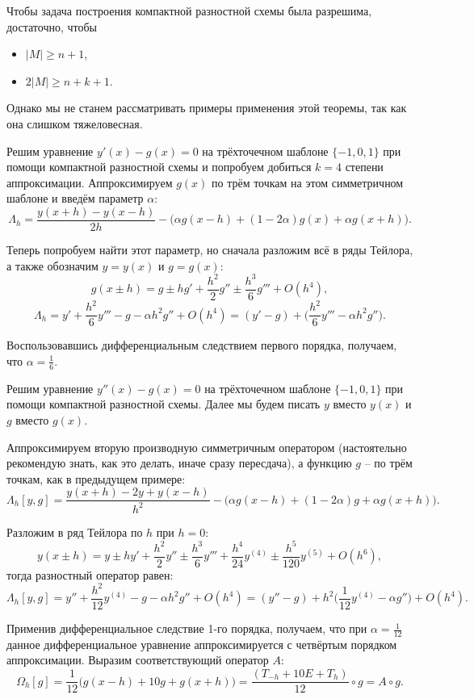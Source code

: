 \documentclass[../main.tex]{subfile}
\begin{document}
\begin{remark}
	Чтобы задача построения компактной разностной схемы была разрешима,
	достаточно, чтобы
	\begin{itemize}[nosep]
		\item $|M|\ge n+1$,
		\item $2|M|\ge n+k+1$.
	\end{itemize}
\end{remark}

Однако мы не станем рассматривать примеры применения этой теоремы, так как она
слишком тяжеловесная.

\begin{example}
	Решим уравнение $y'(x)-g(x)=0$ на трёхточечном шаблоне $\{-1,0,1\}$ при
	помощи компактной разностной схемы и попробуем добиться $k=4$ степени
	аппроксимации. Аппроксимируем $g(x)$ по трём точкам на этом симметричном
	шаблоне и введём параметр $\alpha$:
	\[\Lambda_h=\frac{y(x+h)-y(x-h)}{2h}-\big(\alpha g(x-h)+(1-2\alpha)g(x)+
	\alpha g(x+h)\big).\]

	Теперь попробуем найти этот параметр, но сначала разложим всё в ряды
	Тейлора, а также обозначим $y=y(x)$ и $g=g(x)$:
	\[g(x\pm h)=g\pm hg'+\frac{h^2}{2}g''\pm\frac{h^3}{6}g'''+O(h^4),\]
	\[\Lambda_h=y'+\frac{h^2}{6}y'''-g-\alpha h^2g''+O(h^4)=
	(y'-g)+\Big(\frac{h^2}{6}y'''-\alpha h^2g''\Big).\]

	Воспользовавшись дифференциальным следствием первого порядка, получаем,
	что $\alpha=\frac{1}{6}$.
\end{example}
\newpage

\begin{example}\label{eq:compact_ds_example}
	Решим уравнение $y''(x)-g(x)=0$ на трёхточечном шаблоне $\{-1,0,1\}$
	при помощи компактной разностной схемы. Далее мы будем писать $y$ вместо
	$y(x)$ и $g$ вместо $g(x)$.

	Аппроксимируем вторую производную симметричным оператором (настоятельно
	рекомендую знать, как это делать, иначе сразу пересдача), а функцию
	$g$ -- по трём точкам, как в предыдущем примере:
	\[\Lambda_h[y,g]=\frac{y(x+h)-2y+y(x-h)}{h^2}-\big(\alpha g(x-h)+
	(1-2\alpha)g+\alpha g(x+h)\big).\]

	Разложим в ряд Тейлора по $h$ при $h=0$:
	\[y(x\pm h)=y\pm hy'+\frac{h^2}{2}y''\pm \frac{h^3}{6}y'''+\frac{h^4}
	{24}y^{(4)}\pm\frac{h^5}{120}y^{(5)}+O(h^6),\]
	тогда разностный оператор равен:
	\[\Lambda_h[y,g]=y''+\frac{h^2}{12}y^{(4)}-g-\alpha h^2g''+O(h^4)=
	(y''-g)+h^2\big(\frac{1}{12}y^{(4)}-\alpha g''\big)+O(h^4).\]

	Применив дифференциальное следствие 1-го порядка, получаем, что при
	$\alpha=\frac{1}{12}$ данное дифференциальное уравнение аппроксимируется
	с четвёртым порядком аппроксимации. Выразим соответствующий оператор $A$:
	\[\Omega_h[g]=\frac{1}{12}\big(g(x-h)+10g+g(x+h)\big)=
	\frac{(T_{-h}+10E+T_h)}{12}\circ g=A\circ g.\]
\end{example}
\end{document}
